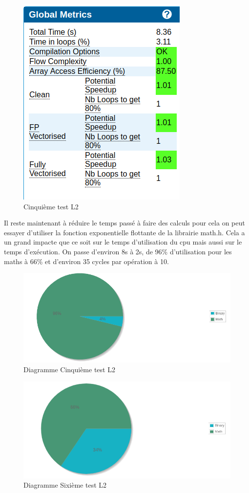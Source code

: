 \documentclass[12pt,a4paper]{article}
\begin{document}
\begin{figure}[ht]
    \includegraphics[scale=0.6]{figures/L2/L2T5.png}
    \caption{Cinquième test L2}
\end{figure}

Il reste maintenant à réduire le temps passé à faire des calculs pour cela 
on peut essayer d'utiliser la fonction exponentielle flottante de la librairie
math.h. Cela a un grand impacte que ce soit sur le temps d'utilisation 
du cpu mais aussi sur le temps d'exécution. On passe d'environ 8s à 2s, de 
96\% d'utilisation pour les maths à 66\% et d'environ 35 cycles par opération à 10.

\begin{figure}[ht]
    \includegraphics[scale=0.6]{figures/L2/L2CamT5.png}
    \caption{Diagramme Cinquième test L2}
\end{figure}

\begin{figure}[ht]
    \includegraphics[scale=0.6]{figures/L2/L2CamT6.png}
    \caption{Diagramme Sixième test L2}
\end{figure}
\end{document}
